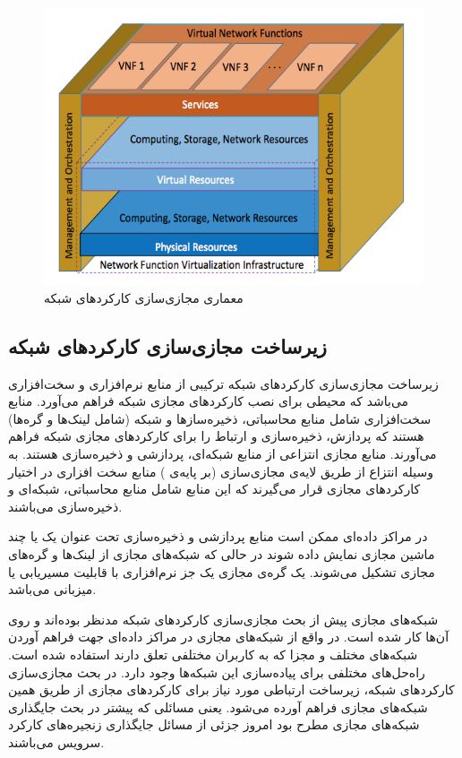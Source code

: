 \begin{figure}[!h]
\center\includegraphics[scale=.6]{images/nfv-arch}
\caption{معماری مجازی‌سازی کارکردهای شبکه
\cite{Mijumbi2016}
}\label{fig.1}
\end{figure}

\subsection{زیرساخت مجازی‌سازی کارکردهای شبکه}
زیرساخت مجازی‌سازی کارکردهای شبکه ترکیبی از منابع نرم‌افزاری و سخت‌افزاری می‌باشد
که محیطی برای نصب
کارکردهای مجازی شبکه فراهم می‌آورد.
منابع سخت‌افزاری شامل منابع محاسباتی،
ذخیره‌سازها و شبکه
(شامل لینک‌ها و گره‌ها)
هستند
که پردازش، ذخیره‌سازی و ارتباط را
برای کارکردهای مجازی شبکه فراهم می‌آورند.
منابع مجازی انتزاعی از منابع شبکه‌ای، پردازشی و ذخیر‌ه‌سازی هستند.
به وسیله انتزاع از طریق لایه‌ی مجازی‌سازی (بر پایه‌ی )
منابع سخت افزاری در اختیار کارکردهای مجازی
قرار می‌گیرند که این منابع شامل منابع محاسباتی، شبکه‌ای و ذخیره‌سازی می‌باشند.

در مراکز داده‌ای ممکن است منابع پردازشی و ذخیره‌سازی تحت عنوان یک یا چند
ماشین مجازی نمایش داده شوند در حالی که شبکه‌های مجازی از لینک‌ها و گره‌های مجازی تشکیل می‌شوند.
یک گره‌ی مجازی یک جز نرم‌افزاری با قابلیت مسیریابی یا میزبانی می‌باشد.

شبکه‌های مجازی پیش از بحث مجازی‌سازی کارکردهای شبکه مدنظر بوده‌اند و روی آن‌ها کار شده است.
در واقع از شبکه‌های مجازی در مراکز داده‌ای جهت فراهم آوردن شبکه‌های مختلف و مجزا که به کاربران مختلفی تعلق دارند
استفاده شده است. راه‌حل‌های مختلفی برای پیاده‌سازی این شبکه‌ها وجود دارد. در بحث مجازی‌سازی کارکردهای شبکه‌، زیرساخت ارتباطی
مورد نیاز 
برای کارکردهای مجازی از طریق همین شبکه‌های مجازی فراهم آورده می‌شود.
یعنی مسائلی که پیشتر در بحث جایگذاری شبکه‌های مجازی مطرح بود
امروز جزئی از مسائل جایگذاری زنجیره‌های کارکرد سرویس می‌باشند.

